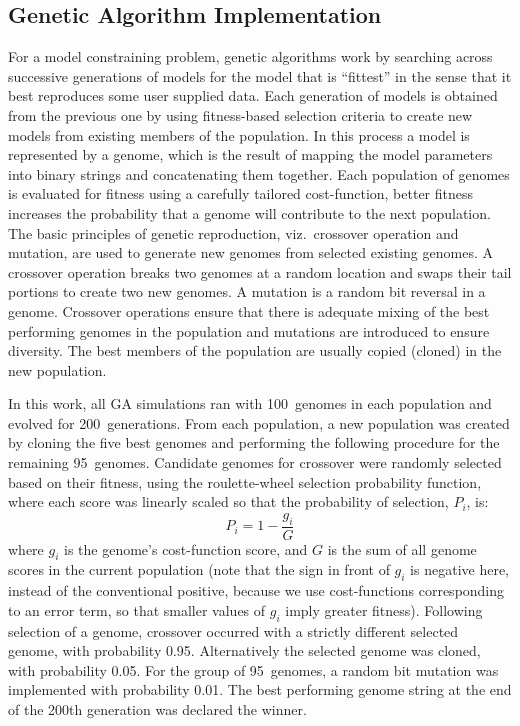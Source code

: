 \subsection{Genetic Algorithm Implementation }

For a model constraining problem, genetic algorithms work by searching
across successive generations of models for the model that is
``fittest'' in the sense that it best reproduces some user supplied
data. Each generation of models is obtained from the previous one by
using fitness-based selection criteria to create new models from
existing members of the population. In this process a model is
represented by a genome, which is the result of mapping the model
parameters into binary strings and concatenating them together. Each
population of genomes is evaluated for fitness using a carefully
tailored cost-function, better fitness increases the probability that
a genome will contribute to the next population.  The basic principles
of genetic reproduction, viz.\ crossover operation and mutation, are
used to generate new genomes from selected existing genomes. A
crossover operation breaks two genomes at a random location and swaps
their tail portions to create two new genomes. A mutation is a random
bit reversal in a genome. Crossover operations ensure that there is
adequate mixing of the best performing genomes in the population and
mutations are introduced to ensure diversity. The best members of the
population are usually copied (cloned) in the new population.

\smallskip{} 

In this work, all GA simulations ran with 100~genomes in each
population and evolved for 200~generations. From each population, a
new population was created by cloning the five best genomes and
performing the following procedure for the remaining 95~genomes.
Candidate genomes for crossover were randomly selected based on their
fitness, using the roulette-wheel selection probability function,
where each score was linearly scaled so that the probability of
selection, $P_i$, is:
\begin{equation} \label{eq:GA:1} 
P_{i} =1 - \frac{g_{i} }{G}
\end{equation}
\noindent where $g_i$ is the genome's cost-function score, and $G$ is
the sum of all genome scores in the current population (note that the
sign in front of $g_i$ is negative here, instead of the conventional
positive, because we use cost-functions corresponding to an error
term, so that smaller values of $g_i$ imply greater
fitness). Following selection of a genome, crossover occurred with a
strictly different selected genome, with probability 0.95.
Alternatively the selected genome was cloned, with probability 0.05.
For the group of 95~genomes, a random bit mutation was implemented
with probability 0.01. The best performing genome string at the end of
the 200th generation was declared the winner.

